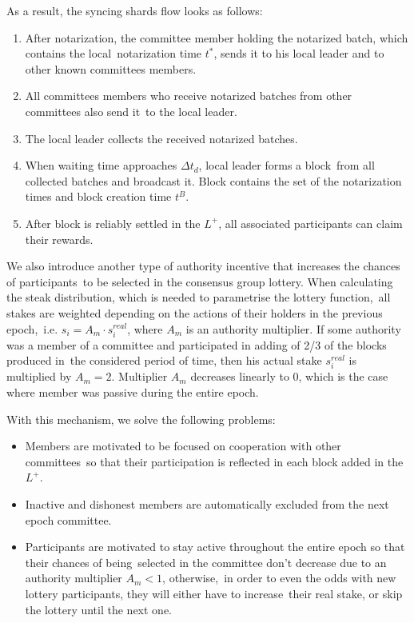 As a result, the syncing shards flow looks as follows:
\begin{enumerate}
    \item After notarization, the committee member holding the notarized batch, which contains the local\
    notarization time $t^*$, sends it to his local leader and to other known committees members.
    \item All committees members who receive notarized batches from other committees also send it\
    to the local leader.
    \item The local leader collects the received notarized batches.
    \item When waiting time approaches $\Delta t_d$, local leader forms a block\
    from all collected batches and broadcast it.
    Block contains the set of the notarization times and block creation time $t^B$.
    \item After block is reliably settled in the $L^+$, all associated participants can claim their rewards.
\end{enumerate}

We also introduce another type of authority incentive that increases the chances of participants\
to be selected in the consensus group lottery.
When calculating the steak distribution, which is needed to parametrise the lottery function,\
all stakes are weighted depending on the actions of their holders in the previous epoch,\
i.e. ${s_i = A_m \cdot s_i^{real}}$, where $A_m$ is an authority multiplier.
If some authority was a member of a committee and participated in adding of 2/3 of the blocks produced in\
the considered period of time, then his actual stake ${s_i^{real}}$ is multiplied by ${A_m = 2}$.
Multiplier $A_m$ decreases linearly to 0, which is the case where member was passive during the entire epoch.

With this mechanism, we solve the following problems:
\begin{itemize}
    \item Members are motivated to be focused on cooperation with other committees\
    so that their participation is reflected in each block added in the $L^+$.
    \item Inactive and dishonest members are automatically excluded from the next epoch committee.
    \item Participants are motivated to stay active throughout the entire epoch so that their chances of being\
    selected in the committee don't decrease due to an authority multiplier ${A_m < 1}$, otherwise,\
    in order to even the odds with new lottery participants, they will either have to increase\
    their real stake, or skip the lottery until the next one.
\end{itemize}

